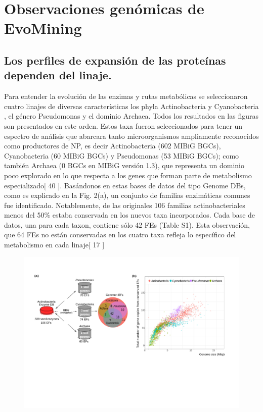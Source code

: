 \documentclass[12pt,twoside]{reedthesis}
\begin{document}
  \section{Observaciones genómicas de
  EvoMining}\label{observaciones-genomicas-de-evomining}
  
  \subsection{Los perfiles de expansión de las proteínas dependen del
  linaje.}\label{los-perfiles-de-expansion-de-las-proteinas-dependen-del-linaje.}
  
  Para entender la evolución de las enzimas y rutas metabólicas se
  seleccionaron cuatro linajes de diversas características los phyla
  Actinobacteria y Cyanobacteria , el género Pseudomonas y el dominio
  Archaea. Todos los resultados en las figuras son presentados en este
  orden. Estos taxa fueron seleccionados para tener un espectro de
  análisis que abarcara tanto microorganismos ampliamente reconocidos como
  productores de NP, es decir Actinobacteria (602 MIBiG BGCs),
  Cyanobacteria (60 MIBiG BGCs) y Pseudomonas (53 MIBiG BGCs); como
  también Archaea (0 BGCs en MIBiG versión 1.3), que representa un dominio
  poco explorado en lo que respecta a los genes que forman parte de
  metabolismo especializado{[} 40 {]}. Basándonos en estas bases de datos
  del tipo Genome DBs, como es explicado en la Fig. 2(a), un conjunto de
  familias enzimáticas comunes fue identificado. Notablemente, de las
  originales 106 familias actinobacteriales menos del 50\% estaba
  conservada en los nuevos taxa incorporados. Cada base de datos, una para
  cada taxon, contiene sólo 42 FEs (Table S1). Esta observación, que 64
  FEs no están conservadas en los cuatro taxa refleja lo específico del
  metabolismo en cada linaje{[} 17 {]}
  
  \begin{figure}[h!tbp]
  \centering
  \includegraphics[angle = 0,scale = .5]{chapter2/FigurasPaper/Figure2.pdf}
  \caption[Seed genomes]{\footnotesize{}}
  \label{fig:SeedGenomes}
  \end{figure}
  
\end{document}
